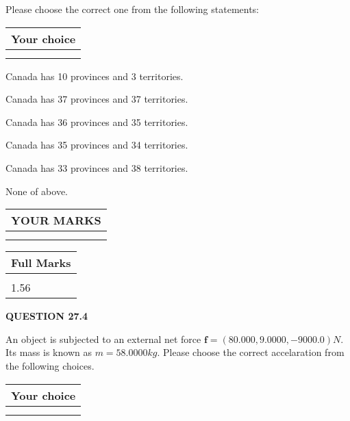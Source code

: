 \documentclass[12pt]{article}
\begin{document}
  
Please choose the correct one from the following statements:
  
  
\noindent\hspace{3.0in} \begin{tabular}{|l|}
\hline
Your choice \\
\hline
 \\ 
 \\ 
\hline
\end{tabular}
  
  
 
 
Canada has  %
10 provinces and  %
3 territories.
 
 
Canada has  %
37 provinces and  %
37 territories.
 
 
Canada has  %
36 provinces and  %
35 territories.
 
 
Canada has  %
35 provinces and  %
34 territories.
 
 
Canada has  %
33 provinces and  %
38 territories.
 
 
 None of above.
 
 
  
\vspace{0.2in}
  
\noindent\begin{tabular}{|l|}
\hline
 YOUR MARKS  \\
\hline
 \\ 
 \\ 
\hline
\end{tabular}
\hspace{0.05in} \begin{tabular}{|l|}
\hline
 Full Marks  \\
\hline
 \\ 
1.56 \\
\hline
\end{tabular}
{\textbf{\Large{QUESTION
27.4 
}}}
  
  
 
An object is subjected to an external net force $\mathbf{f}=(
80.000 ,
9.0000,
-9000.0  )N$. Its mass is known as
$m= %
58.0000  kg$. Please choose the correct accelaration
from the following choices.
 
  
  
\noindent\hspace{3.0in} \begin{tabular}{|l|}
\hline
Your choice \\
\hline
 \\ 
 \\ 
\hline
\end{tabular}
  
\end{document}
